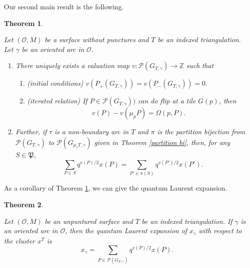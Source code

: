 \documentclass[10pt]{amsart}
\theoremstyle{theorems}
\newtheorem{Theorem}{Theorem}[section]
\begin{document}
\medskip

Our second main result is the following.

\medskip

\begin{Theorem}\label{mainthm}

Let $(\mathcal O,M)$ be a surface without punctures and $T$ be an indexed triangulation. Let $\gamma$ be an oriented arc in $\mathcal O$.

\begin{enumerate}[$(1)$]

  \item  There uniquely exists a \emph{valuation} map $v:\mathcal P(G_{T,\gamma})\rightarrow \mathbb Z$ such that

\begin{enumerate}[$(a)$]

  \item (initial conditions) $v(P_{+}(G_{T,\gamma}))=v(P_{-}(G_{T,\gamma}))=0$.

  \item (iterated relation) If $P\in \mathcal P(G_{T,\gamma}))$ can do flip at a tile $G(p)$, then $$v(P)-v(\mu_pP)=\Omega(p,P).$$

\end{enumerate}

  \item Further, if $\tau$ is a non-boundary arc in $T$ and $\pi$ is the partition bijection from $\mathcal P(G_{T,\gamma})$ to $\mathcal P(G_{\mu_\tau T, \gamma})$ given in Theorem \ref{partition bi}, then, for any $S\in \mathfrak P$,
      $$\textstyle\sum_{P\in S}q^{v(P)/2}x(P)=\textstyle\sum_{P'\in \pi(S)}q^{v(P')/2}x(P').$$

\end{enumerate}

\end{Theorem}

\medskip

As a corollary of Theorem \ref{mainthm}, we can give the quantum Laurent expansion.

\medskip

\begin{Theorem}\label{expansion}

Let $(\mathcal O,M)$ be an unpuntured surface and $T$ be an indexed triangulation. If $\gamma$ is an oriented arc in $\mathcal O$, then the quantum Laurent expansion of $x_{\gamma}$ with respect to the cluster $x^{T}$ is $$x_{\gamma}=\textstyle\sum_{P\in \mathcal P(G_{T,\gamma})} q^{v(P)/2}x(P).$$

\end{Theorem}
\end{document}
